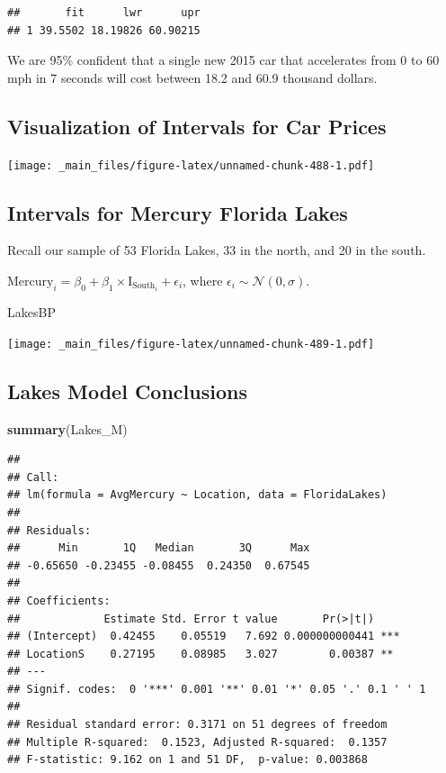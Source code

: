 \documentclass[]{book}
\newenvironment{Shaded}{\begin{snugshade}}{\end{snugshade}}
\newcommand{\KeywordTok}[1]{\textcolor[rgb]{0.13,0.29,0.53}{\textbf{#1}}}
\newcommand{\NormalTok}[1]{#1}
\begin{document}
\begin{verbatim}
##       fit      lwr      upr
## 1 39.5502 18.19826 60.90215
\end{verbatim}

We are 95\% confident that a single new 2015 car that accelerates from 0
to 60 mph in 7 seconds will cost between 18.2 and 60.9 thousand dollars.

\subsection{Visualization of Intervals for Car
Prices}\label{visualization-of-intervals-for-car-prices}

\texttt{[image: \_main\_files/figure-latex/unnamed-chunk-488-1.pdf]}

\subsection{Intervals for Mercury Florida
Lakes}\label{intervals-for-mercury-florida-lakes}

Recall our sample of 53 Florida Lakes, 33 in the north, and 20 in the
south.

\(\text{Mercury}_i = \beta_0 + \beta_1\times\text{I}_{\text{South}_i} + \epsilon_i\),
where \(\epsilon_i\sim\mathcal{N}(0, \sigma)\).

\begin{Shaded}
\begin{Highlighting}[]
\NormalTok{LakesBP}
\end{Highlighting}
\end{Shaded}

\texttt{[image: \_main\_files/figure-latex/unnamed-chunk-489-1.pdf]}

\subsection{Lakes Model Conclusions}\label{lakes-model-conclusions}

\begin{Shaded}
\begin{Highlighting}[]
\KeywordTok{summary}\NormalTok{(Lakes_M)}
\end{Highlighting}
\end{Shaded}

\begin{verbatim}
## 
## Call:
## lm(formula = AvgMercury ~ Location, data = FloridaLakes)
## 
## Residuals:
##      Min       1Q   Median       3Q      Max 
## -0.65650 -0.23455 -0.08455  0.24350  0.67545 
## 
## Coefficients:
##             Estimate Std. Error t value       Pr(>|t|)    
## (Intercept)  0.42455    0.05519   7.692 0.000000000441 ***
## LocationS    0.27195    0.08985   3.027        0.00387 ** 
## ---
## Signif. codes:  0 '***' 0.001 '**' 0.01 '*' 0.05 '.' 0.1 ' ' 1
## 
## Residual standard error: 0.3171 on 51 degrees of freedom
## Multiple R-squared:  0.1523, Adjusted R-squared:  0.1357 
## F-statistic: 9.162 on 1 and 51 DF,  p-value: 0.003868
\end{verbatim}
\end{document}
